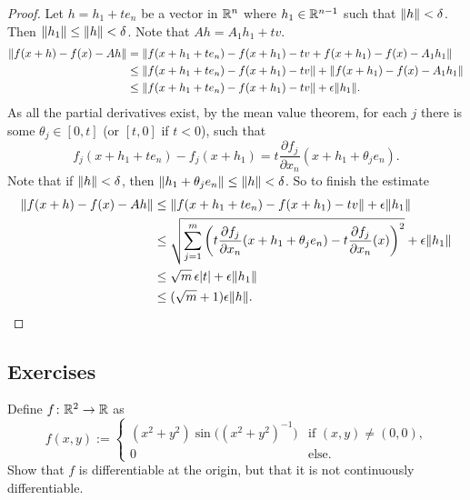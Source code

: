 \begin{proof}
Let $h = h_1 + t e_n$ be a vector in ${\mathbb{R}}^n$ where $h_1 \in {\mathbb{R}}^{n-1}$ such that
$\lVert {h} \rVert < \delta$.  Then $\lVert {h_1} \rVert \leq \lVert {h} \rVert < \delta$.
Note that $Ah = A_1h_1 + tv$.
\begin{equation*}
\begin{split}
\lVert {f(x+h) - f(x) - Ah} \rVert
& = \lVert {f(x+h_1 + t e_n) - f(x+h_1) - tv + f(x+h_1) - f(x) - A_1h_1} \rVert
\\
& \leq \lVert {f(x+h_1 + t e_n) - f(x+h_1) -tv} \rVert + \lVert {f(x+h_1) - f(x) -
A_1h_1} \rVert
\\
& \leq \lVert {f(x+h_1 + t e_n) - f(x+h_1) -tv} \rVert + \epsilon \lVert {h_1} \rVert .
\end{split}
\end{equation*}
As all the partial derivatives exist, by the mean value theorem,
for each $j$ there is some $\theta_j \in [0,t]$ (or $[t,0]$ if $t < 0$), such that
\begin{equation*}
f_j(x+h_1 + t e_n) - f_j(x+h_1) =
t \frac{\partial f_j}{\partial x_n}(x+h_1+\theta_j e_n).
\end{equation*}
Note that if $\lVert {h} \rVert < \delta$, then $\lVert {h_1+\theta_j e_n} \rVert \leq \lVert {h} \rVert
< \delta$.
So to finish the estimate
\begin{equation*}
\begin{split}
\lVert {f(x+h) - f(x) - Ah} \rVert
& \leq \lVert {f(x+h_1 + t e_n) - f(x+h_1) -tv} \rVert + \epsilon \lVert {h_1} \rVert
\\
& \leq \sqrt{\sum_{j=1}^m {\left(t\frac{\partial f_j}{\partial
x_n}(x+h_1+\theta_j e_n) -
t \frac{\partial f_j}{\partial x_n}(x)\right)}^2} + \epsilon \lVert {h_1} \rVert
\\
& \leq \sqrt{m}\, \epsilon \lvert {t} \rvert + \epsilon \lVert {h_1} \rVert
\\
& \leq (\sqrt{m}+1)\epsilon \lVert {h} \rVert . \qedhere
\end{split}
\end{equation*}
\end{proof}

\subsection{Exercises}

\begin{exercise}
Define $f \colon {\mathbb{R}}^2 \to {\mathbb{R}}$ as
\begin{equation*}
f(x,y) :=
\begin{cases}
(x^2+y^2)\sin\bigl({(x^2+y^2)}^{-1}\bigr) & \text{if $(x,y)
\not= (0,0)$,} \\
0 & \text{else.}
\end{cases}
\end{equation*}
Show that $f$ is differentiable at the origin, but that it is not 
continuously differentiable.
\end{exercise}


